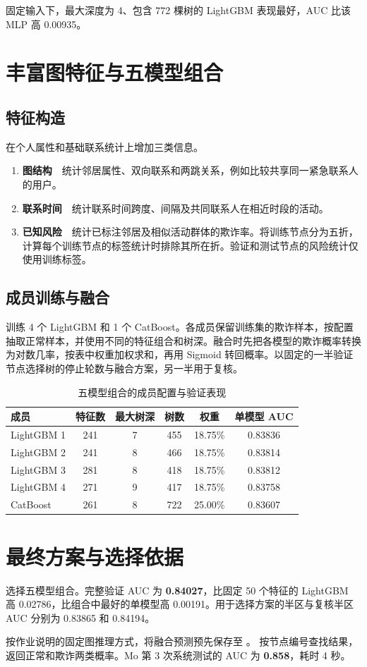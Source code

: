 \documentclass[UTF8,a4paper,zihao=-4,fontset=fandol]{ctexart}
\newcommand*{\code}[1]{\texttt{\detokenize{#1}}}
\begin{document}
固定输入下，最大深度为 4、包含 772 棵树的 LightGBM 表现最好，AUC 比该 MLP 高 0.00935。

\clearpage
\section{丰富图特征与五模型组合}
\subsection{特征构造}
在个人属性和基础联系统计上增加三类信息。
\begin{enumerate}
  \item \textbf{图结构}　统计邻居属性、双向联系和两跳关系，例如比较共享同一紧急联系人的用户。
  \item \textbf{联系时间}　统计联系时间跨度、间隔及共同联系人在相近时段的活动。
  \item \textbf{已知风险}　统计已标注邻居及相似活动群体的欺诈率。将训练节点分为五折，计算每个训练节点的标签统计时排除其所在折。验证和测试节点的风险统计仅使用训练标签。
\end{enumerate}

\subsection{成员训练与融合}
训练 4 个 LightGBM 和 1 个 CatBoost。各成员保留训练集的欺诈样本，按配置抽取正常样本，并使用不同的特征组合和树深。融合时先把各模型的欺诈概率转换为对数几率，按表中权重加权求和，再用 Sigmoid 转回概率。以固定的一半验证节点选择树的停止轮数与融合方案，另一半用于复核。

\begin{table}[H]
  \centering
  \caption{五模型组合的成员配置与验证表现}
  \small
  \begin{tabular*}{\linewidth}{@{\extracolsep{\fill}}lccccc@{}}
    \toprule
    成员 & 特征数 & 最大树深 & 树数 & 权重 & 单模型 AUC\\
    \midrule
    LightGBM 1 & 241 & 7 & 455 & 18.75\% & 0.83836\\
    LightGBM 2 & 241 & 8 & 466 & 18.75\% & 0.83814\\
    LightGBM 3 & 281 & 8 & 418 & 18.75\% & 0.83812\\
    LightGBM 4 & 271 & 9 & 417 & 18.75\% & 0.83758\\
    CatBoost & 261 & 8 & 722 & 25.00\% & 0.83607\\
    \bottomrule
  \end{tabular*}
\end{table}

\section{最终方案与选择依据}
选择五模型组合。完整验证 AUC 为 \textbf{0.84027}，比固定 50 个特征的 LightGBM 高 0.02786，比组合中最好的单模型高 0.00191。用于选择方案的半区与复核半区 AUC 分别为 0.83865 和 0.84194。

按作业说明的固定图推理方式，将融合预测预先保存至 \allowbreak{}。\code{main.py} 按节点编号查找结果，返回正常和欺诈两类概率。Mo 第 3 次系统测试的 AUC 为 \textbf{0.858}，耗时 4 秒。
\end{document}
